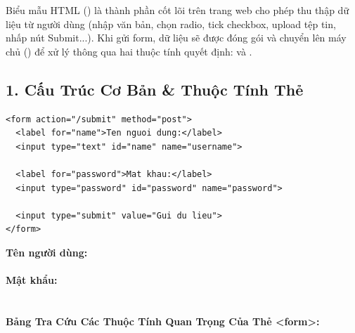 Biểu mẫu HTML () là thành phần cốt lõi trên trang web cho phép thu thập dữ liệu từ người dùng (nhập văn bản, chọn radio, tick checkbox, upload tệp tin, nhấp nút Submit...). Khi gửi form, dữ liệu sẽ được đóng gói và chuyển lên máy chủ () để xử lý thông qua hai thuộc tính quyết định:  và .

\subsection{1. Cấu Trúc Cơ Bản \& Thuộc Tính Thẻ }

\begin{codeWindow}
\begin{lstlisting}[language=HTML5]
<form action="/submit" method="post">
  <label for="name">Ten nguoi dung:</label>
  <input type="text" id="name" name="username">
  
  <label for="password">Mat khau:</label>
  <input type="password" id="password" name="password">
  
  <input type="submit" value="Gui du lieu">
</form>
\end{lstlisting}
\end{codeWindow}

\begin{browserWindow}
\sffamily\small
\begin{tcolorbox}[colback=white, colframe=primaryBlue!30, arc=4pt, boxrule=0.8pt, top=8pt, bottom=8pt, left=10pt, right=10pt]
  \textbf{Tên người dùng:} \\[2pt]
  \tcbox[on line, arc=3pt, colback=codeBg, colframe=codeBorder, boxsep=2pt, left=8pt, right=50pt]{\textcolor{codeComment}{Nguyễn Văn A}} \\[8pt]
  \textbf{Mật khẩu:} \\[2pt]
  \tcbox[on line, arc=3pt, colback=codeBg, colframe=codeBorder, boxsep=2pt, left=8pt, right=50pt]{\textcolor{darkText}{$\bullet\bullet\bullet\bullet\bullet\bullet\bullet\bullet$}} \\[10pt]
\end{tcolorbox}
\end{browserWindow}

\paragraph{Bảng Tra Cứu Các Thuộc Tính Quan Trọng Của Thẻ <form>:}

